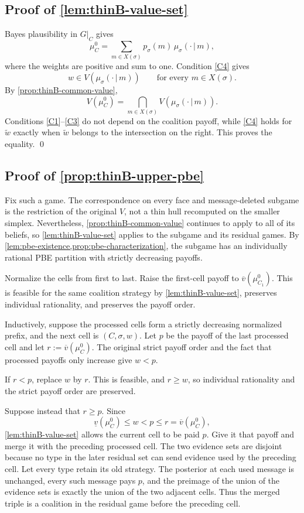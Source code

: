 \documentclass[11pt]{article}
\newcommand{\sep}{\,|\,}
\begin{document}
\subsection*{Proof of \cref{lem:thinB-value-set}}
Bayes plausibility in $G\vert_C$ gives
\[
    \mu^0_C
    =
    \sum_{m\in X(\sigma)}
    p_\sigma(m)\,\mu_\sigma(\cdot\sep m),
\]
where the weights are positive and sum to one. Condition \cref{C4} gives
\[
    w\in V(\mu_\sigma(\cdot\sep m))
    \qquad\text{for every }m\in X(\sigma).
\]
By \cref{prop:thinB-common-value},
\[
    V(\mu^0_C)
    =
    \bigcap_{m\in X(\sigma)}
    V(\mu_\sigma(\cdot\sep m)).
\]
Conditions \cref{C1}--\cref{C3} do not depend on the coalition payoff, while \cref{C4} holds for $\widetilde w$ exactly when $\widetilde w$ belongs to the intersection on the right. This proves the equality. \qed

\subsection*{Proof of \cref{prop:thinB-upper-pbe}}
Fix such a game. The correspondence on every face and message-deleted subgame is the restriction of the original $V$, not a thin hull recomputed on the smaller simplex. Nevertheless, \cref{prop:thinB-common-value} continues to apply to all of its beliefs, so \cref{lem:thinB-value-set} applies to the subgame and its residual games. By \cref{lem:pbe-existence,prop:pbe-characterization}, the subgame has an individually rational PBE partition with strictly decreasing payoffs.

Normalize the cells from first to last. Raise the first-cell payoff to $\overline v(\mu^0_{C_1})$. This is feasible for the same coalition strategy by \cref{lem:thinB-value-set}, preserves individual rationality, and preserves the payoff order.

Inductively, suppose the processed cells form a strictly decreasing normalized prefix, and the next cell is $(C,\sigma,w)$. Let $p$ be the payoff of the last processed cell and let $r:=\overline v(\mu^0_C)$. The original strict payoff order and the fact that processed payoffs only increase give $w<p$.

If $r<p$, replace $w$ by $r$. This is feasible, and $r\geq w$, so individual rationality and the strict payoff order are preserved.

Suppose instead that $r\geq p$. Since
\[
    \underline v(\mu^0_C)\leq w<p\leq r=\overline v(\mu^0_C),
\]
\cref{lem:thinB-value-set} allows the current cell to be paid $p$. Give it that payoff and merge it with the preceding processed cell. The two evidence sets are disjoint because no type in the later residual set can send evidence used by the preceding cell. Let every type retain its old strategy. The posterior at each used message is unchanged, every such message pays $p$, and the preimage of the union of the evidence sets is exactly the union of the two adjacent cells. Thus the merged triple is a coalition in the residual game before the preceding cell.
\end{document}
